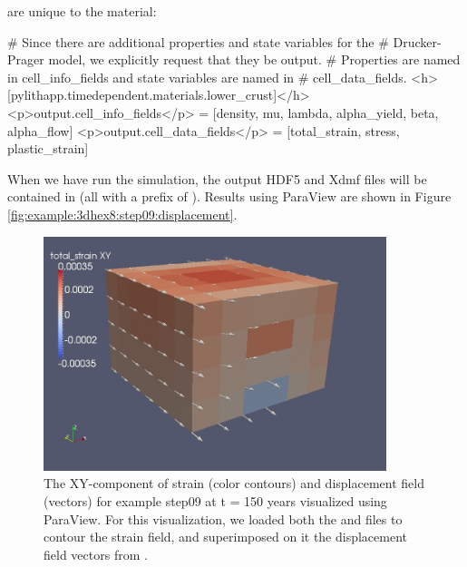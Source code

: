 are unique to the  material:
\begin{cfg}
# Since there are additional properties and state variables for the
# Drucker-Prager model, we explicitly request that they be output.
# Properties are named in cell\_info\_fields and state variables are named in
# cell_data_fields.
<h>[pylithapp.timedependent.materials.lower_crust]</h>
<p>output.cell_info_fields</p> = [density, mu, lambda, alpha_yield, beta, alpha_flow]
<p>output.cell_data_fields</p> = [total_strain, stress, plastic_strain]
\end{cfg}
When we have run the simulation, the output HDF5 and Xdmf files will
be contained in  (all with a prefix
of ). Results using ParaView are shown in Figure
\vref{fig:example:3dhex8:step09:displacement}.

\begin{figure}
  \includegraphics[width=10cm]{examples/figs/3dhex8_step08-strain-displ-t150}
  \caption{The XY-component of strain (color contours) and displacement field
    (vectors) for example step09 at t = 150 years visualized using ParaView.
    For this visualization, we loaded both the 
    and  files to contour the strain field,
    and superimposed on it the displacement field vectors from .}
  \label{fig:example:3dhex8:step09:displacement}
\end{figure}

